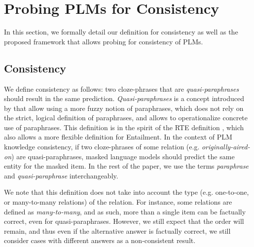 \section{Probing PLMs for Consistency}
\label{sec:probe}

In this section, we formally detail our definition for consistency as well as the proposed framework that allows probing for consistency of PLMs.

\subsection{Consistency}
We define consistency as follows: two cloze-phrases that are \textit{quasi-paraphrases} should result in the same prediction.
\textit{Quasi-paraphrases} is a concept introduced by \citet{what_is_paraphrase} that allow using a more fuzzy notion of paraphrases, which does not rely on the strict, logical definition of paraphrases, and allows to operationalize concrete use of paraphrases. This definition is in the spirit of the RTE definition \cite{dagan-rte}, which also allows a more flexible definition for Entailment.
In the context of PLM knowledge consistency, if two cloze-phrases of some relation (e.g. \textit{originally-aired-on}) are quasi-paraphrases, masked language models should predict the same entity for the masked item. 
In the rest of the paper, we use the terms \textit{paraphrase} and \textit{quasi-paraphrase} interchangeably.

 

We note that this definition does not take into account the type (e.g. one-to-one, or many-to-many relations) of the relation. %
For instance, some relations are defined as \textit{many-to-many}, and as such, more than a single item can be factually correct, even for quasi-paraphrases. However, we still expect that the order will remain, and thus even if the alternative answer is factually correct, we still consider cases with different answers as a non-consistent result.


